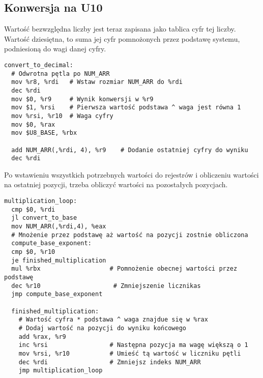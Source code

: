 \documentclass[11pt]{report}
\begin{document}
\subsection{Konwersja na U10}
Wartość bezwzględna liczby jest teraz zapisana jako tablica cyfr tej liczby. Wartość dziesiętna, to suma jej cyfr pomnożonych przez podstawę systemu, podniesioną do wagi danej cyfry.
\begin{verbatim}
convert_to_decimal:
  # Odwrotna pętla po NUM_ARR
  mov %r8, %rdi   # Wstaw rozmiar NUM_ARR do %rdi
  dec %rdi
  mov $0, %r9     # Wynik konwersji w %r9
  mov $1, %rsi    # Pierwsza wartość podstawa ^ waga jest równa 1
  mov %rsi, %r10  # Waga cyfry
  mov $0, %rax    
  mov $U8_BASE, %rbx
  
  add NUM_ARR(,%rdi, 4), %r9	# Dodanie ostatniej cyfry do wyniku
  dec %rdi
\end{verbatim}
\newpage
\noindent
Po wstawieniu wszystkich potrzebnych wartości do rejestrów i obliczeniu wartości na ostatniej pozycji, trzeba obliczyć wartości na pozostałych pozycjach.
\begin{verbatim}
multiplication_loop:
  cmp $0, %rdi
  jl convert_to_base
  mov NUM_ARR(,%rdi,4), %eax 
  # Mnożenie przez podstawę aż wartość na pozycji zostnie obliczona
  compute_base_exponent:	 
  cmp $0, %r10               
  je finished_multiplication
  mul %rbx                   # Pomnożenie obecnej wartości przez podstawę
  dec %r10					  # Zmniejszenie licznikas
  jmp compute_base_exponent
  
  finished_multiplication:  
    # Wartość cyfra * podstawa ^ waga znajdue się w %rax
    # Dodaj wartość na pozycji do wyniku końcowego    
    add %rax, %r9
    inc %rsi                 # Następna pozycja ma wagę większą o 1
    mov %rsi, %r10           # Umieść tą wartość w liczniku pętli
    dec %rdi                 # Zmniejsz indeks NUM_ARR
    jmp multiplication_loop
\end{verbatim}
\end{document}
